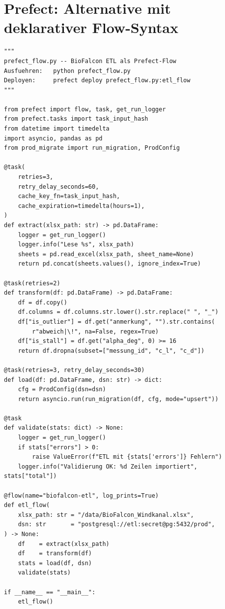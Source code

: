﻿\documentclass[12pt,a4paper]{report}
\theoremstyle{definition}
\theoremstyle{remark}
\begin{document}
\section{Prefect: Alternative mit deklarativer Flow-Syntax}

\begin{lstlisting}[style=python, caption={prefect\_flow.py: ETL als Prefect-Flow}, label=lst:prefect]
"""
prefect_flow.py -- BioFalcon ETL als Prefect-Flow
Ausfuehren:   python prefect_flow.py
Deployen:     prefect deploy prefect_flow.py:etl_flow
"""

from prefect import flow, task, get_run_logger
from prefect.tasks import task_input_hash
from datetime import timedelta
import asyncio, pandas as pd
from prod_migrate import run_migration, ProdConfig

@task(
    retries=3,
    retry_delay_seconds=60,
    cache_key_fn=task_input_hash,
    cache_expiration=timedelta(hours=1),
)
def extract(xlsx_path: str) -> pd.DataFrame:
    logger = get_run_logger()
    logger.info("Lese %s", xlsx_path)
    sheets = pd.read_excel(xlsx_path, sheet_name=None)
    return pd.concat(sheets.values(), ignore_index=True)

@task(retries=2)
def transform(df: pd.DataFrame) -> pd.DataFrame:
    df = df.copy()
    df.columns = df.columns.str.lower().str.replace(" ", "_")
    df["is_outlier"] = df.get("anmerkung", "").str.contains(
        r"abweich|\!", na=False, regex=True)
    df["is_stall"] = df.get("alpha_deg", 0) >= 16
    return df.dropna(subset=["messung_id", "c_l", "c_d"])

@task(retries=3, retry_delay_seconds=30)
def load(df: pd.DataFrame, dsn: str) -> dict:
    cfg = ProdConfig(dsn=dsn)
    return asyncio.run(run_migration(df, cfg, mode="upsert"))

@task
def validate(stats: dict) -> None:
    logger = get_run_logger()
    if stats["errors"] > 0:
        raise ValueError(f"ETL mit {stats['errors']} Fehlern")
    logger.info("Validierung OK: %d Zeilen importiert", stats["total"])

@flow(name="biofalcon-etl", log_prints=True)
def etl_flow(
    xlsx_path: str = "/data/BioFalcon_Windkanal.xlsx",
    dsn: str       = "postgresql://etl:secret@pg:5432/prod",
) -> None:
    df    = extract(xlsx_path)
    df    = transform(df)
    stats = load(df, dsn)
    validate(stats)

if __name__ == "__main__":
    etl_flow()
\end{lstlisting}

\end{document}
